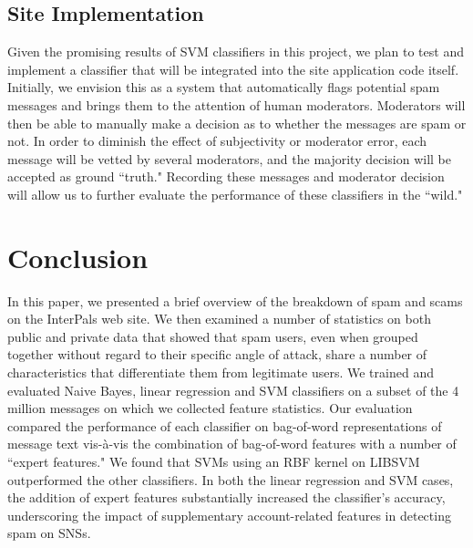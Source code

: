 \documentclass[preprint]{acm_proc_article-sp}
\begin{document}
\subsection{Site Implementation}

Given the promising results of SVM classifiers in this project, we plan to test and implement a classifier that will 
be integrated into the site application code itself. Initially, we envision this as a system that automatically flags 
potential spam messages and brings them to the attention of human moderators. Moderators will then be able to manually 
make a decision as to whether the messages are spam or not. In order to diminish the effect of subjectivity or moderator 
error, each message will be vetted by several moderators, and the majority decision will be accepted as ground ``truth." 
Recording these messages and moderator decision will allow us to further evaluate the performance of these classifiers in 
the ``wild."

\section{Conclusion}

In this paper, we presented a brief overview of the breakdown of spam and scams on the InterPals web site. 
We then examined a number of statistics on both public and private data that showed that spam users, even when 
grouped together without regard to their specific angle of attack, share a number of characteristics that differentiate 
them from legitimate users. We trained and evaluated Naive Bayes, linear regression and SVM classifiers on a subset 
of the 4 million messages on which we collected feature statistics. Our evaluation compared the performance of 
each classifier on bag-of-word representations of message text vis-\`{a}-vis the combination of bag-of-word features 
with a number of ``expert features." We found that SVMs using an RBF kernel on LIBSVM outperformed the other 
classifiers. In both the linear regression and SVM cases, the addition of expert features substantially increased 
the classifier's accuracy, underscoring the impact of supplementary account-related features in detecting spam on 
SNSs.




\balancecolumns
\end{document}
